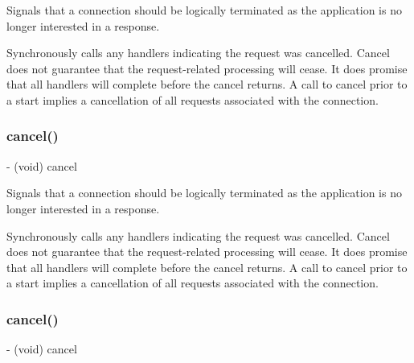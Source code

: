 Signals that a connection should be logically terminated as the application is no longer interested in a response.

Synchronously calls any handlers indicating the request was cancelled. Cancel does not guarantee that the request-\/related processing will cease. It does promise that all handlers will complete before the cancel returns. A call to cancel prior to a start implies a cancellation of all requests associated with the connection. \mbox{\label{interfaceFBRequestConnection_aacedf34994dad63d0b6272cfec921889}} 
\subsubsection{\texorpdfstring{cancel()}{cancel()}\hspace{0.1cm}{\footnotesize\ttfamily [4/5]}}
{\footnotesize\ttfamily -\/ (void) cancel \begin{DoxyParamCaption}{ }\end{DoxyParamCaption}}

Signals that a connection should be logically terminated as the application is no longer interested in a response.

Synchronously calls any handlers indicating the request was cancelled. Cancel does not guarantee that the request-\/related processing will cease. It does promise that all handlers will complete before the cancel returns. A call to cancel prior to a start implies a cancellation of all requests associated with the connection. \mbox{\label{interfaceFBRequestConnection_aacedf34994dad63d0b6272cfec921889}} 
\subsubsection{\texorpdfstring{cancel()}{cancel()}\hspace{0.1cm}{\footnotesize\ttfamily [5/5]}}
{\footnotesize\ttfamily -\/ (void) cancel \begin{DoxyParamCaption}{ }\end{DoxyParamCaption}}


